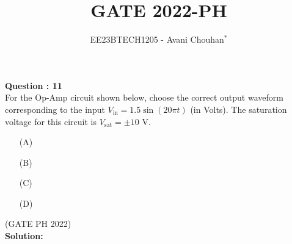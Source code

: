 \documentclass[journal,12pt,twocolumn]{IEEEtran}
\begin{document}

\vspace{3cm}

\title{GATE 2022-PH}
\author{EE23BTECH1205 - Avani Chouhan$^{*}$}
\maketitle
\bigskip

\renewcommand{\thefigure}{\theenumi}
\renewcommand{\thetable}{\theenumi}

\vspace{3cm}
\textbf{Question : 11} \\
For the Op-Amp circuit shown below, choose the correct output waveform corresponding to the input \( V_{\text{in}} = 1.5 \sin(20 \pi t) \) (in Volts). The saturation voltage for this circuit is \( V_{\text{sat}} = \pm 10 \) V.
\begin{figure}[ht]
\centering
    
    \label{fig:1}
\end{figure}
\begin{enumerate}
  \item[(A)]
  \begin{figure}[ht!]
    \centering
    
    \label{fig:ap13}
\end{figure}
  \item[(B)]  
  \begin{figure}[ht]
    \centering
    
    \label{fig:ap06}
\end{figure}
  \item[(C)] 
  \begin{figure}[ht]
    \centering
    
    \label{fig:ap03}
\end{figure}
  \item[(D)] 
   \begin{figure}[ht]
    \centering
    
    \label{fig:ap16}
\end{figure}
\end{enumerate}

\hfill{(GATE PH 2022)}\\
\textbf{Solution:} \\
\end{document}

